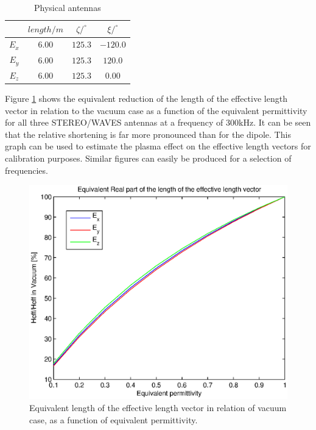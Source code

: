 \documentclass[a4paper,11pt]{article}
\begin{document}
\begin{table}
\begin{center}
\caption{Physical antennas}
\label{tab:phys_ant}
\begin{tabular}{|c|c|c|c|}
 \hline
 & $length/m$ & $\zeta/^\circ$ & $\xi/^\circ$ \\
\hline
$E_x$ & $6.00$ & $125.3$ & $-120.0$ \\
$E_y$ & $6.00$ & $125.3$ & $120.0$ \\
$E_z$ & $6.00$ & $125.3$ & $0.00$ \\
\hline\end{tabular}
\end{center}
\end{table}

Figure \ref{fig:relative_heff_shortening_stereo} shows the equivalent reduction of the length of the effective length vector in relation to the vacuum case as a function of the equivalent permittivity for all three STEREO/WAVES antennas at a frequency of 300kHz. It can be seen that the relative shortening is far more pronounced than for the dipole. This graph can be used to estimate the plasma effect on the effective length vectors for calibration purposes. Similar figures can easily be produced for a selection of frequencies.\\

\begin{figure}
  \includegraphics[width=12cm]{heff_shortening_stereo.eps}
\caption{Equivalent length of the effective length vector in relation of vacuum case, as a function of equivalent permittivity.}
\label{fig:relative_heff_shortening_stereo}
\end{figure}
\end{document}
